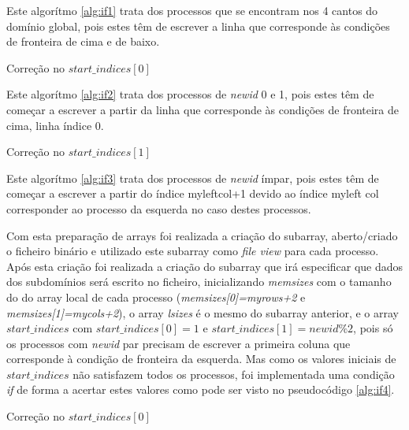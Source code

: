 \documentclass[10pt]{extarticle}
\begin{document}
Este algorítmo \ref{alg:if1} trata dos processos que se encontram nos 4 cantos do domínio global, pois estes têm de escrever a linha que corresponde às condições de fronteira de cima e de baixo.  
 
\begin{algorithm}[H]
 
 \caption{Correção no \textit{$start\_indices[0]$}}
 \label{alg:if2}
 \end{algorithm}
 
Este algorítmo \ref{alg:if2} trata dos processos de \textit{newid} 0 e 1, pois estes têm de começar a escrever a partir da linha que corresponde às condições de fronteira de cima, linha índice 0.  
 
 \begin{algorithm}[H]
   
 \caption{Correção no \textit{$start\_indices[1]$}}
 \label{alg:if3}
 \end{algorithm}
 
Este algorítmo \ref{alg:if3} trata dos processos de \textit{newid} ímpar, pois estes têm de começar a escrever a partir do índice myleftcol+1 devido ao índice  myleft col corresponder ao processo da esquerda no caso destes processos. 

Com esta preparação de arrays foi realizada a criação do subarray, aberto/criado o ficheiro binário e utilizado este subarray como \textit{file view} para cada processo. Após esta criação foi realizada a criação do subarray que irá especificar que dados dos subdomínios será escrito no ficheiro, inicializando \textit{memsizes} com o tamanho do do array local de cada processo (\textit{memsizes[0]=myrows+2} e \textit{memsizes[1]=mycols+2}), o array \textit{lsizes} é o mesmo do subarray anterior, e o array \textit{$start\_indices$} com \textit{$start\_indices[0]=1$} e \textit{$start\_indices[1]=newid\%2$}, pois só os processos com \textit{newid} par precisam de escrever a primeira coluna que corresponde à condição de fronteira da esquerda. Mas como os valores iniciais de \textit{$start\_indices$} não satisfazem todos os processos, foi implementada uma condição \textit{if} de forma a acertar estes valores como pode ser visto no pseudocódigo \ref{alg:if4}.

\begin{algorithm}[H]
 
 \caption{Correção no \textit{$start\_indices[0]$}}
 \label{alg:if4}
 \end{algorithm}
\end{document}
